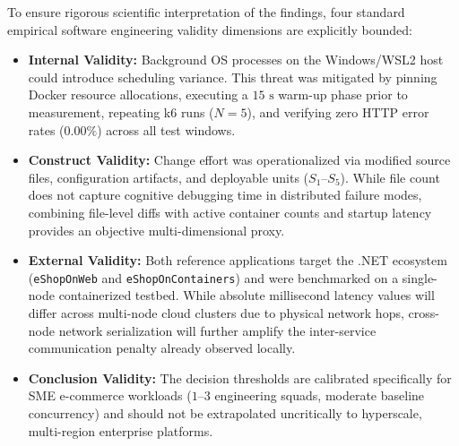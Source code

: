 To ensure rigorous scientific interpretation of the findings, four standard empirical software engineering validity dimensions are explicitly bounded:
\begin{itemize}
    \item \textbf{Internal Validity:} Background OS processes on the Windows/WSL2 host could introduce scheduling variance. This threat was mitigated by pinning Docker resource allocations, executing a $15\text{ s}$ warm-up phase prior to measurement, repeating k6 runs ($N = 5$), and verifying zero HTTP error rates ($0.00\%$) across all test windows.
    \item \textbf{Construct Validity:} Change effort was operationalized via modified source files, configuration artifacts, and deployable units ($S_1$--$S_5$). While file count does not capture cognitive debugging time in distributed failure modes, combining file-level diffs with active container counts and startup latency provides an objective multi-dimensional proxy.
    \item \textbf{External Validity:} Both reference applications target the .NET ecosystem (\texttt{eShopOnWeb} and \texttt{eShopOnContainers}) and were benchmarked on a single-node containerized testbed. While absolute millisecond latency values will differ across multi-node cloud clusters due to physical network hops, cross-node network serialization will further amplify the inter-service communication penalty already observed locally.
    \item \textbf{Conclusion Validity:} The decision thresholds are calibrated specifically for SME e-commerce workloads ($1$--$3$ engineering squads, moderate baseline concurrency) and should not be extrapolated uncritically to hyperscale, multi-region enterprise platforms.
\end{itemize}
